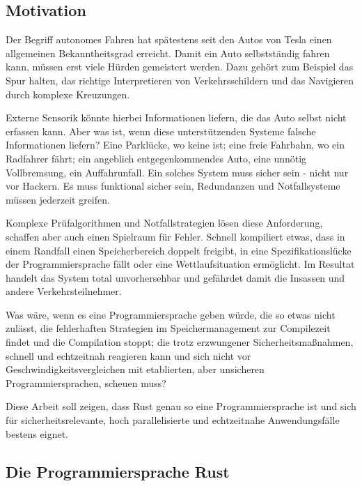 \begin{multicols}{2}

\subsection*{Motivation}

Der Begriff autonomes Fahren hat spätestens seit den Autos von Tesla einen allgemeinen Bekanntheitsgrad erreicht. Damit ein Auto selbstständig fahren kann, müssen erst viele Hürden gemeistert werden.
Dazu gehört zum Beispiel das Spur halten, das richtige Interpretieren von Verkehrsschildern und das Navigieren durch komplexe Kreuzungen.

Externe Sensorik könnte hierbei Informationen liefern, die das Auto selbst nicht erfassen kann.
Aber was ist, wenn diese unterstützenden Systeme falsche Informationen liefern?
Eine Parklücke, wo keine ist; eine freie Fahrbahn, wo ein Radfahrer fährt; ein angeblich entgegenkommendes Auto, eine unnötig Vollbremsung, ein Auffahrunfall.
Ein solches System muss sicher sein - nicht nur vor Hackern.
Es muss funktional sicher sein, Redundanzen und Notfallsysteme müssen jederzeit greifen.

Komplexe Prüfalgorithmen und Notfallstrategien lösen diese Anforderung, schaffen aber auch einen Spielraum für Fehler.
Schnell kompiliert etwas, dass in einem Randfall einen Speicherbereich doppelt freigibt, in eine Spezifikationslücke der Programmiersprache fällt oder eine Wettlaufsituation ermöglicht.
Im Resultat handelt das System total unvorhersehbar und gefährdet damit die Insassen und andere Verkehrsteilnehmer.

Was wäre, wenn es eine Programmiersprache geben würde, die so etwas nicht zulässt, die fehlerhaften Strategien im Speichermanagement zur Compilezeit findet und die Compilation stoppt; die trotz erzwungener Sicherheitsmaßnahmen, schnell und echtzeitnah reagieren kann und sich nicht vor Geschwindigkeitsvergleichen mit etablierten, aber unsicheren Programmiersprachen, scheuen muss?

Diese Arbeit soll zeigen, dass Rust genau so eine Programmiersprache ist und sich für sicherheitsrelevante, hoch parallelisierte und echtzeitnahe Anwendungsfälle bestens eignet.

\subsection*{Die Programmiersprache Rust}


\end{multicols}
